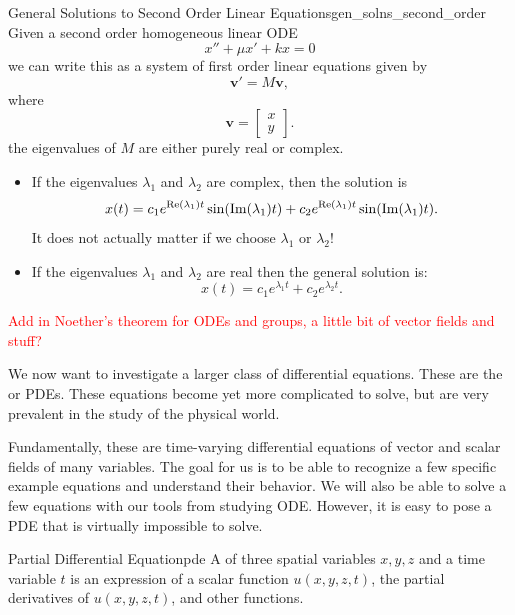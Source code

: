         \begin{prop}{General Solutions to Second Order Linear Equations}{gen_solns_second_order}
        Given a second order homogeneous linear ODE
        \[
        x'' + \mu x' + kx = 0
        \]
        we can write this as a system of first order linear equations given by
        \[
        \mathbf{v}' = M \mathbf{v},
        \]
        where
        \[
        \mathbf{v} = \begin{bmatrix} x \\ y \end{bmatrix}.
        \]
        the eigenvalues of $M$ are either purely real or complex.
        
        \begin{itemize}
            \item If the eigenvalues $\lambda_1$ and $\lambda_2$ are complex, then the solution is
        \[
        x(t)= c_1 e^{\mathrm{Re}(\lambda_1)t} \sin(\mathrm{Im}(\lambda_1)t) + c_2 e^{\mathrm{Re}(\lambda_1)t} \sin(\mathrm{Im}(\lambda_1)t).
        \]
        It does not actually matter if we choose $\lambda_1$ or $\lambda_2$!
        \item         If the eigenvalues $\lambda_1$ and $\lambda_2$ are real then the general solution is:
        \[
        x(t) = c_1 e^{\lambda_1 t} + c_2 e^{\lambda_2 t}.
        \]
        \end{itemize}
        \end{prop}

    \textcolor{red}{Add in Noether's theorem for ODEs and groups, a little bit of vector fields and stuff?}


        We now want to investigate a larger class of differential equations.  These are the  or PDEs.  These equations become yet more complicated to solve, but are very prevalent in the study of the physical world.
        
        Fundamentally, these are time-varying differential equations of vector and scalar fields of many variables.  The goal for us is to be able to recognize a few specific example equations and understand their behavior.  We will also be able to solve a few equations with our tools from studying ODE. However, it is easy to pose a PDE that is virtually impossible to solve.  
        
        \begin{df}{Partial Differential Equation}{pde}
        A  of three spatial variables $x,y,z$ and a time variable $t$ is an expression of a scalar function $u(x,y,z,t)$, the partial derivatives of $u(x,y,z,t)$, and other functions.
        \end{df}
        
